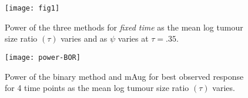 \documentclass[10pt,A4]{article}
\begin{document}
\begin{figure}
\centering
\texttt{[image: fig1]}
\caption{\label{Fig1}Power of the three methods for \textit{fixed time} as the mean log tumour size ratio $(\tau)$ varies and as $\psi$ varies at $\tau =.35$.}
\end{figure}

\begin{figure}
\centering
\texttt{[image: power-BOR]}
\caption{\label{Fig2} Power of the binary method and mAug for best observed response for 4 time points as the mean log tumour size ratio $(\tau)$ varies.}
\end{figure}
\end{document}
